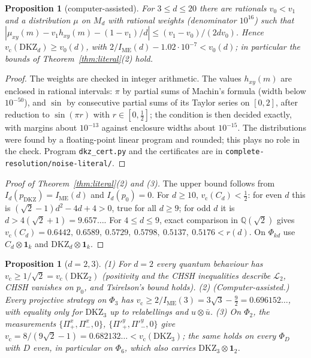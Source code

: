 \documentclass[11pt]{amsart}
\newtheorem{proposition}[theorem]{Proposition}
\theoremstyle{definition}
\theoremstyle{remark}
\numberwithin{equation}{section}
\newcommand{\one}{\mathbf{1}}
\newcommand{\IME}{I_{\mathrm{ME}}}
\newcommand{\Q}{\mathbb{Q}}
\newcommand{\cL}{\mathcal{L}}
\newcommand{\vc}{v_{\mathrm c}}
\newcommand{\DKZ}{\mathrm{DKZ}}
\begin{document}
\begin{proposition}[computer-assisted]\label{prop:dkzcert}
For $3\le d\le20$ there are rationals $v_0<v_1$ and a distribution $\mu$ on $M_d$ with rational weights (denominator
$10^{16}$) such that $|\mu_{xy}(m)-v_1h_{xy}(m)-(1-v_1)/d|\le(v_1-v_0)/(2dv_0)$. Hence $\vc(\DKZ_d)\ge v_0(d)$, with
$2/\IME(d)-1.02\cdot10^{-7}<v_0(d)$; in particular the bounds of Theorem~\ref{thm:literal}(2) hold.
\end{proposition}

\begin{proof}
The weights are checked in integer arithmetic. The values $h_{xy}(m)$ are enclosed in rational intervals: $\pi$ by
partial sums of Machin's formula (width below $10^{-50}$), and $\sin$ by consecutive partial sums of its Taylor series
on $[0,2]$, after reduction to $\sin(\pi r)$ with $r\in[0,\frac12]$; the condition is then decided exactly, with margins
about $10^{-13}$ against enclosure widths about $10^{-15}$. The distributions were found by a floating-point linear
program\cite{HiGHS} and rounded; this plays no role in the check. Program \texttt{dkz\_cert.py} and the certificates are
in \texttt{complete-resolution/noise-literal/}.
\end{proof}

\begin{proof}[Proof of Theorem~\ref{thm:literal}(2) and (3)]
The upper bound follows from $I_d(p_{\DKZ})=\IME(d)$ and $I_d(p_0)=0$. For $d\ge10$, $\vc(C_d)<\frac12$: for even $d$
this is $(\sqrt2-1)d^2-4d+4>0$, true for all $d\ge9$; for odd $d$ it is $d>4(\sqrt2+1)=9.657\ldots$. For $4\le d\le9$,
exact comparison in $\Q(\sqrt2)$ gives $\vc(C_d)=0.6442,\ 0.6589,\ 0.5729,\ 0.5798,\ 0.5137,\ 0.5176<r(d)$. On
$\Phi_{kd}$ use $C_d\otimes\one_k$ and $\DKZ_d\otimes\one_k$.
\end{proof}

\begin{proposition}[$d=2,3$]\label{prop:small}
(1) For $d=2$ every quantum behaviour has $\vc\ge1/\sqrt2=\vc(\DKZ_2)$ (positivity and the CHSH inequalities describe
$\cL_2$\cite{Fine}, CHSH vanishes on $p_0$, and Tsirelson's bound\cite{Tsirelson} holds). (2) (Computer-assisted.) Every
projective strategy on $\Phi_3$ has $\vc\ge2/\IME(3)=3\sqrt3-\frac92=0.696152\ldots$, with equality only for $\DKZ_3$ up
to relabellings and $u\otimes\bar u$. (3) On $\Phi_2$, the measurements $\{\Pi^x_+,\Pi^x_-,0\}$, $\{\Pi'^y_+,\Pi'^y_-,0\}$
give $\vc=8/(9\sqrt2-1)=0.682132\ldots<\vc(\DKZ_3)$; the same holds on every $\Phi_D$ with $D$ even, in particular on
$\Phi_6$, which also carries $\DKZ_3\otimes\one_2$.
\end{proposition}
\end{document}
